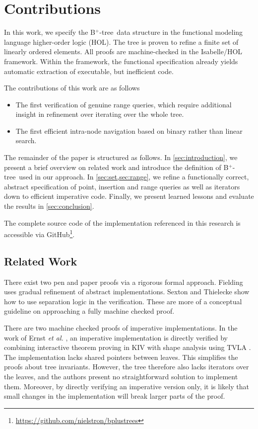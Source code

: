 \documentclass[a4paper,UKenglish,cleveref, cref, thm-restate]{lipics-v2021}
\newcommand{\btree}{B$^+$-tree}
\begin{document}
\section{Contributions}

In this work, we specify the \btree\ data structure in the
functional modeling language higher-order logic (HOL).
The tree is proven to refine a finite set of linearly ordered elements.
All proofs are machine-checked in the Isabelle/HOL framework.
Within the framework,
the functional specification already yields automatic extraction of executable,
but inefficient code.

 The contributions of this work are as follows
\begin{itemize}
   \item The first verification of genuine range queries,
         which require additional insight in refinement over iterating over the whole tree.
   \item The first efficient intra-node navigation based on binary rather than linear search.
\end{itemize}

The remainder of the paper is structured as follows.
In \cref{sec:introduction}, we present a brief overview on related
work and introduce the definition of \btree\ used in our approach.
In \cref{sec:set,sec:range},
we refine a functionally correct, abstract specification of
point, insertion and range queries as well as iterators
down to efficient imperative code.
Finally, we present learned lessons and evaluate the results
in \cref{sec:conclusion}.

The complete source code of the implementation referenced in this research
is accessible via GitHub\footnote{\url{https://github.com/nielstron/bplustrees}}.

\subsection{Related Work}
\label{sec:related_work}

There exist two pen and paper proofs via a rigorous formal approach.
Fielding \cite{Fielding80} uses gradual refinement of abstract
implementations.
Sexton and Thielecke \cite{DBLP:journals/entcs/SextonT08} show how to use 
separation logic in the verification.
These are more of a conceptual guideline on approaching a fully machine checked proof.

There are two machine checked proofs of imperative implementations.
In the work of Ernst \emph{et al.} \cite{DBLP:journals/sosym/ErnstSR15},
an imperative implementation is directly verified
by combining interactive theorem proving in KIV \cite{ReifKIV}
with shape analysis using TVLA \cite{DBLP:journals/toplas/SagivRW02}.
The implementation lacks shared pointers between leaves.
This simplifies the proofs about tree invariants.
However, the tree therefore also lacks iterators over the leaves,
and the authors present no straightforward solution to implement them.
Moreover, by directly verifying an imperative version only,
it is likely that small changes in the implementation will
break larger parts of the proof.
\end{document}
